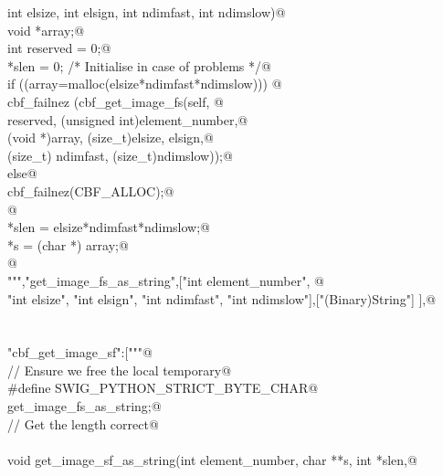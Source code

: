 \documentclass[10pt,a4paper,twoside,notitlepage]{article}
\begin{document}
\begin{flushleft}
\begin{list}{}{}
\mbox{}\verb@    int elsize, int elsign, int ndimfast, int ndimslow){@\\
\mbox{}\verb@        void *array;@\\
\mbox{}\verb@        int reserved = 0;@\\
\mbox{}\verb@        *slen = 0; /* Initialise in case of problems */@\\
\mbox{}\verb@        if ((array=malloc(elsize*ndimfast*ndimslow))) {@\\
\mbox{}\verb@               cbf_failnez (cbf_get_image_fs(self, @\\
\mbox{}\verb@               reserved, (unsigned int)element_number,@\\
\mbox{}\verb@               (void *)array, (size_t)elsize, elsign,@\\
\mbox{}\verb@               (size_t) ndimfast, (size_t)ndimslow));@\\
\mbox{}\verb@         }else{@\\
\mbox{}\verb@               cbf_failnez(CBF_ALLOC);@\\
\mbox{}\verb@         }@\\
\mbox{}\verb@        *slen = elsize*ndimfast*ndimslow;@\\
\mbox{}\verb@        *s = (char *) array;@\\
\mbox{}\verb@      }@\\
\mbox{}\verb@""","get_image_fs_as_string",["int element_number", @\\
\mbox{}\verb@    "int elsize", "int elsign", "int ndimfast", "int ndimslow"],["(Binary)String"] ],@\\
\mbox{}\verb@@\\
\mbox{}\verb@@\\
\mbox{}\verb@"cbf_get_image_sf":["""@\\
\mbox{}\verb@// Ensure we free the local temporary@\\
\mbox{}\verb@%{@\\
\mbox{}\verb@#define SWIG_PYTHON_STRICT_BYTE_CHAR@\\
\mbox{}\verb@%}@\\
\mbox{}\verb@%cstring_output_allocate_size(char ** s, int *slen, free(*$1))@\\
\mbox{}\verb@       get_image_fs_as_string;@\\
\mbox{}\verb@// Get the length correct@\\
\mbox{}\verb@@\\
\mbox{}\verb@    void get_image_sf_as_string(int element_number, char **s, int *slen,@\\

\end{list}
\end{flushleft}
\end{document}
